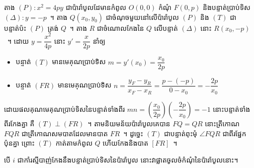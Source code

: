 \begin{answer}
	តាង $ (P):x^2=4py $ ជាប៉ារ៉ាបូលដែមានកំពូល $ O(0,0) $ កំណុំ $ F(0,p) $ និងបន្ទាត់ប្រាប់ទិស $ (\Delta):y=-p $~។ តាង $ Q(x_0,y_0) $ ជាចំណុចមួយនៅលើប៉ារ៉ាបូល $ (P) $ និង $ (T) $ ជាបន្ទាត់ប៉ះ $ (P) $ ត្រង់ $ Q $~។ តាង $ R $ ជាចំណោលកែងនៃ $ Q $ លើបន្ទាត់ $ (\Delta) $ នោះ $ R(x_0,-p) $~។ ដោយ $ y=\dfrac{x^2}{4p} $ នោះ $ y'=\dfrac{x}{2p} $ នាំឲ្យ
	\begin{itemize}
		\item បន្ទាត់ $ (T) $ មានមេគុណប្រាប់ទិស $ m=y'(x_0)=\dfrac{x_0}{2p} $
		\item បន្ទាត់ $ (FR) $ មានមេគុណប្រាប់ទិស $ n=\dfrac{y_F-y_R}{x_F-x_R}=\dfrac{p-(-p)}{0-x_0}=-\dfrac{2p}{x_0} $
	\end{itemize}
	ដោយផលគុណមេគុណប្រាប់ទិសនៃបន្ទាត់ទាំងពីរ $ mn=\left(\dfrac{x_0}{2p}\right)\left(-\dfrac{2p}{x_0}\right)=-1 $ នោះបន្ទាត់ទាំងពីរកែងគ្នា គឺ $ (T)\perp(FR) $~។ តាមនិយមន័យប៉ារ៉ាបូលគេបាន $ FQ=QR $ នោះត្រីកោណ $ FQR $ ជាត្រីកោណសមបាតដែលមានបាត $ FR $~។ ដូច្នេះ $ (T) $ ជាបន្ទាត់ពុះមុំ $ \angle FQR $ ជាពីរផ្នែកប៉ុនគ្នា ព្រោះ $ (T) $ កាត់តាមកំពូល $ Q $ ហើយកែងនិងបាត $ [FR] $~។
\end{answer}
%
\begin{remark*}
	បើ $ i $ ជាកាំរស្មីបាញ់កែងនឹងបន្ទាត់ប្រាប់ទិសនៃប៉ារ៉ាបូល នោះវាផ្លាតចូលចំកំណុំនៃប៉ារ៉ាបូលនោះ។
\end{remark*}
%
